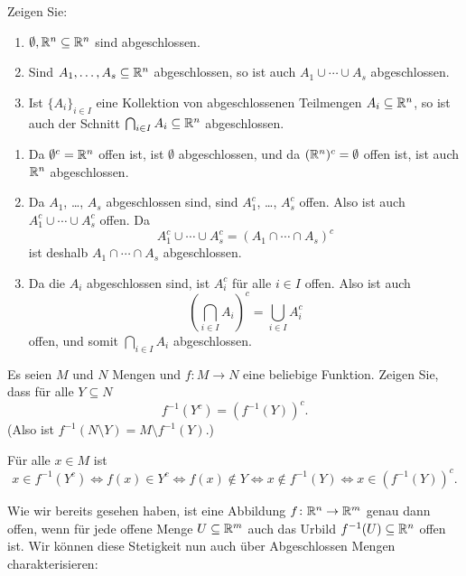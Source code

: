 \documentclass[a4paper,10pt]{article}
\begin{document}
\begin{question}
 Zeigen Sie:
 \begin{enumerate}
  \item
   $\emptyset, \mathbb{R}^n \subseteq \mathbb{R}^n$ sind abgeschlossen.
  \item
   Sind $A_1, \dotsc, A_s \subseteq \mathbb{R}^n$ abgeschlossen, so ist auch $A_1 \cup \dotsb \cup A_s$ abgeschlossen.
  \item
   Ist $\{A_i\}_{i \in I}$ eine Kollektion von abgeschlossenen Teilmengen $A_i \subseteq \mathbb{R}^n$, so ist auch der Schnitt $\bigcap_{i \in I} A_i \subseteq \mathbb{R}^n$ abgeschlossen.
 \end{enumerate}
\end{question}
\begin{solution}
 \begin{enumerate}
  \item
   Da $\emptyset^c = \mathbb{R}^n$ offen ist, ist $\emptyset$ abgeschlossen, und da $(\mathbb{R}^n)^c = \emptyset$ offen ist, ist auch $\mathbb{R}^n$ abgeschlossen.
  \item
   Da $A_1$, \dots, $A_s$ abgeschlossen sind, sind $A_1^c$, \dots, $A_s^c$ offen. Also ist auch $A_1^c \cup \dotsb \cup A_s^c$ offen. Da
   \[
    A_1^c \cup \dotsb \cup A_s^c
    = (A_1 \cap \dotsb \cap A_s)^c
   \]
   ist deshalb $A_1 \cap \dotsb \cap A_s$ abgeschlossen.
  \item
   Da die $A_i$ abgeschlossen sind, ist $A_i^c$ für alle $i \in I$ offen. Also ist auch
   \[
    \left( \bigcap_{i \in I} A_i \right)^c
    = \bigcup_{i \in I} A_i^c
   \]
   offen, und somit $\bigcap_{i \in I} A_i$ abgeschlossen.
 \end{enumerate}
\end{solution}


\begin{question}
 Es seien $M$ und $N$ Mengen und $f \colon M \to N$ eine beliebige Funktion. Zeigen Sie, dass für alle $Y \subseteq N$
 \[
  f^{-1}(Y^c) = (f^{-1}(Y))^c.
 \]
 (Also ist $f^{-1}(N \setminus Y) = M \setminus f^{-1}(Y)$.)
\end{question}
\begin{solution}
 Für alle $x \in M$ ist
 \[
  x \in f^{-1}(Y^c)
  \Leftrightarrow f(x) \in Y^c
  \Leftrightarrow f(x) \notin Y
  \Leftrightarrow x \notin f^{-1}(Y)
  \Leftrightarrow x \in (f^{-1}(Y))^c.
 \]
\end{solution}


Wie wir bereits gesehen haben, ist eine Abbildung $f \colon \mathbb{R}^n \to \mathbb{R}^m$ genau dann offen, wenn für jede offene Menge $U \subseteq \mathbb{R}^m$ auch das Urbild $f^{-1}(U) \subseteq \mathbb{R}^n$ offen ist. Wir können diese Stetigkeit nun auch über Abgeschlossen Mengen charakterisieren:
\end{document}
